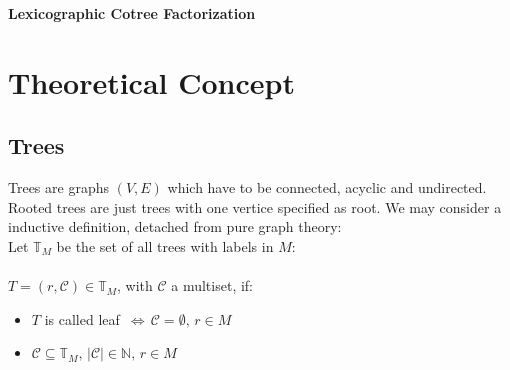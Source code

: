 \documentclass[a4paper,12pt]{article}
\theoremstyle{definition}
\newcommand{\Uebungsblatt}{Lexicographic Cotree Factorization}
\begin{document}
	\thispagestyle{fancy}
	\pagestyle{fancy}
	\begin{center}
		\LARGE \sf \textbf{ \Uebungsblatt{}}
	\end{center}
	\vspace*{0.1cm}
	\tableofcontents
	\newpage
	\thispagestyle{fancy}
	\section{Theoretical Concept}
	\subsection{Trees}
		Trees are graphs $(V,E)$ which have to be connected, acyclic and undirected. Rooted trees are just trees with one vertice specified as root.
		We may consider a inductive definition, detached from pure graph theory:\\
		Let $\mathds{T}_M$ be the set of all trees with labels in $M$:\\\\
		$T=(r,\mathcal{C}) \in \mathds{T}_M$, with $\mathcal{C}$  a multiset, if:
		\begin{itemize}
			\item $T$ is called leaf $\,\Longleftrightarrow\,\mathcal{C}=\emptyset,\, r\in M$
			\item $\mathcal{C}\subseteq \mathds{T}_M,\,|\mathcal{C}|\in\mathds{N},\, r\in M$
		\end{itemize}
\end{document}
